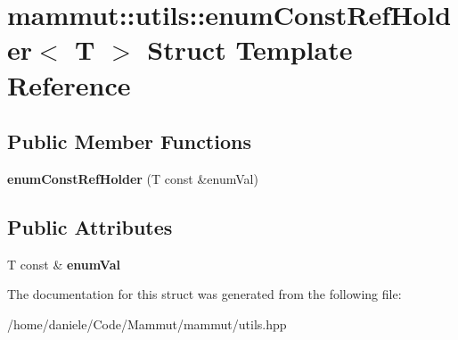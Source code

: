 \hypertarget{structmammut_1_1utils_1_1enumConstRefHolder}{\section{mammut\-:\-:utils\-:\-:enum\-Const\-Ref\-Holder$<$ T $>$ Struct Template Reference}
\label{structmammut_1_1utils_1_1enumConstRefHolder}
}
\subsection*{Public Member Functions}
\begin{DoxyCompactItemize}
\item 
\hypertarget{structmammut_1_1utils_1_1enumConstRefHolder_afdca471346bac7da0ea94c6a5df311c4}{{\bfseries enum\-Const\-Ref\-Holder} (T const \&enum\-Val)}\label{structmammut_1_1utils_1_1enumConstRefHolder_afdca471346bac7da0ea94c6a5df311c4}

\end{DoxyCompactItemize}
\subsection*{Public Attributes}
\begin{DoxyCompactItemize}
\item 
\hypertarget{structmammut_1_1utils_1_1enumConstRefHolder_ada294ffa1da728c24a86411bf3860120}{T const \& {\bfseries enum\-Val}}\label{structmammut_1_1utils_1_1enumConstRefHolder_ada294ffa1da728c24a86411bf3860120}

\end{DoxyCompactItemize}


The documentation for this struct was generated from the following file\-:\begin{DoxyCompactItemize}
\item 
/home/daniele/\-Code/\-Mammut/mammut/utils.\-hpp\end{DoxyCompactItemize}
